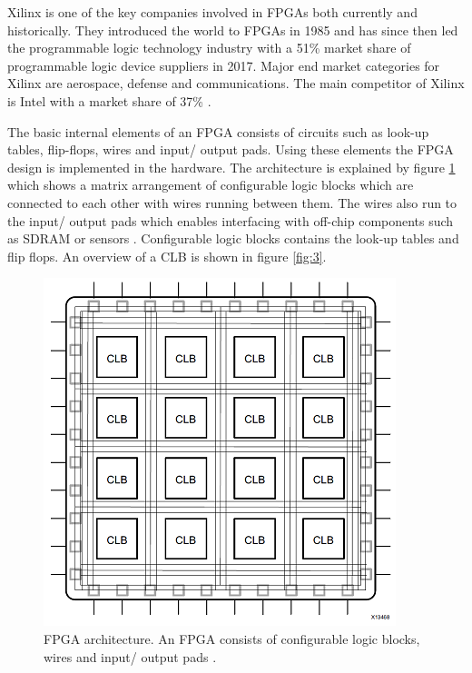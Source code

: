 \documentclass[12pt]{report}
\begin{document}
\par
Xilinx is one of the key companies involved in FPGAs both currently and historically. They introduced the world to FPGAs in 1985 and has since then led the programmable logic technology industry with a 51\% market share of programmable logic device suppliers in 2017. Major end market categories for Xilinx are aerospace, defense and communications. The main competitor of Xilinx is Intel with a market share of 37\% \citep{XilHist}\citep{XilShare}.
\par
The basic internal elements of an FPGA consists of circuits such as look-up tables, flip-flops, wires and input/ output pads. Using these elements the FPGA design is implemented in the hardware.
The architecture is explained by figure \ref{fig:2} which shows a matrix arrangement of configurable logic blocks which are connected to each other with wires running between them. The wires also run to the input/ output pads which enables interfacing with off-chip components such as SDRAM or sensors \citep{XilFPGAIntro}. Configurable logic blocks contains the look-up tables and flip flops. An overview of a CLB is shown in figure \ref{fig:3}.

\begin{figure}[h]
    \centering
    \includegraphics[scale=0.55]{figures/basic_fpga.png}
    \caption{FPGA architecture. An FPGA consists of configurable logic blocks, wires and input/ output pads \citep{XilFPGAIntro}.}
    \label{fig:2}
\end{figure}
\end{document}
